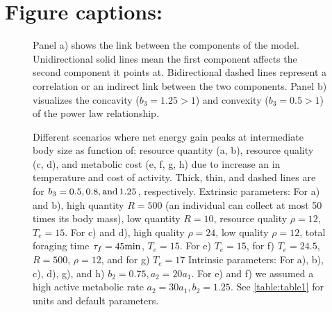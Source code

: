 \section*{Figure captions:}
\begin{figure}[H]
\begin{center}
\caption{
	Panel a) shows the link between the components of the model.
	Unidirectional solid lines mean the first component affects the second component it points at.
	Bidirectional dashed lines represent a correlation or an indirect link between the two components.
	Panel b) visualizes the concavity ($b_3  = 1.25 > 1$) and convexity ($b_3 = 0.5 > 1$) of the power law relationship.
}
\label{fig1}
\end{center}
\end{figure}
%
\begin{figure}[H]
\begin{center}
\caption{
	Different scenarios where net energy gain peaks at intermediate body size as function of: resource quantity (a, b), resource quality (c, d), and metabolic cost (e, f, g, h) due to increase an in temperature and cost of activity.
	Thick, thin, and dashed lines are for $b_3 = 0.5, 0.8, \rm{ and }\, 1.25$, respectively.
	Extrinsic parameters:
	For a) and b), high quantity $R = 500$ (an individual can collect at most 50 times its body mass), low quantity $R= 10$, resource quality $\rho = 12$, $T_e = 15$.
	For c) and d), high quality $\rho = 24$, low quality $\rho = 12$, total foraging time $\tau_f = 45 \rm{min}$, $T_e = 15$.
	For e) $T_e = 15$, for f) $T_e = 24.5$, $R = 500$, $\rho = 12$, and for g) $T_e = 17$
	Intrinsic parameters:
	For a), b), c), d), g), and h) $b_2 = 0.75, a_2 = 20 a_1$.
	For e) and f) we assumed a high active metabolic rate $a_2 = 30 a_1, b_2  = 1.25$.
	See \cref{table:table1} for units and default parameters.
}
\label{fig2}
\end{center}
\end{figure}

